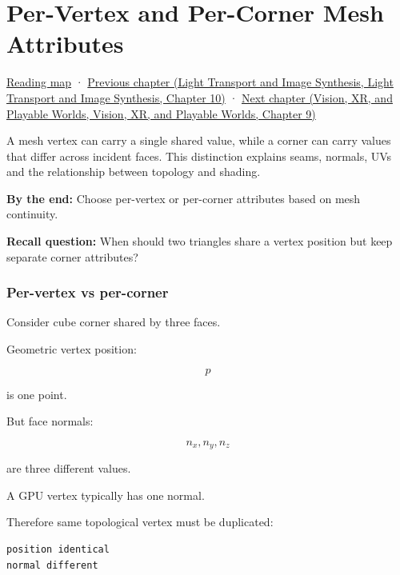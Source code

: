 \hypertarget{04-visual-computing-ii-ch041}{}
\chapter{Per-Vertex and Per-Corner Mesh Attributes}\label{stagechapter:04-visual-computing-ii-ch041}\label{04-visual-computing-ii-ch041-per-vertex-and-per-corner-mesh-attributes}

\hyperref[volume-reading-map]{Reading map} · \href{../04-Light-Transport-and-Image-Synthesis/main.pdf\#nameddest=04-visual-computing-ii-ch040-lighting-reconstruction-and-surface-motion}{Previous chapter (Light Transport and Image Synthesis, Light Transport and Image Synthesis, Chapter 10)} · \href{../07-Vision-XR-and-Playable-Worlds/main.pdf\#nameddest=04-visual-computing-ii-ch042-xr-radiometry-optics-and-perception}{Next chapter (Vision, XR, and Playable Worlds, Vision, XR, and Playable Worlds, Chapter 9)}

A mesh vertex can carry a single shared value, while a corner can carry values that differ across incident faces. This distinction explains seams, normals, UVs and the relationship between topology and shading.

\textbf{By the end:} Choose per-vertex or per-corner attributes based on mesh continuity.

\textbf{Recall question:} When should two triangles share a vertex position but keep separate corner attributes?

\subsection{Per-vertex vs per-corner}\label{04-visual-computing-ii-ch041-per-vertex-vs-per-corner}

Consider cube corner shared by three faces.

Geometric vertex position:

\[
p
\]

is one point.

But face normals:

\[
n_x,n_y,n_z
\]

are three different values.

A GPU vertex typically has one normal.

Therefore same topological vertex must be duplicated:

\begin{verbatim}
position identical
normal different
\end{verbatim}

